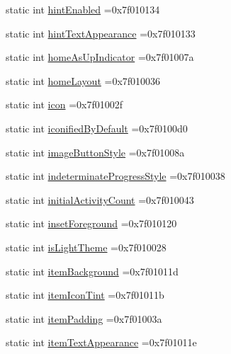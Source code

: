 \begin{DoxyCompactItemize}
static int \hyperlink{classandroid_1_1support_1_1v4_1_1R_1_1attr_a5f4a8cb83603d7a45db4b5284ebe1a41}{hint\+Enabled} =0x7f010134
\item 
static int \hyperlink{classandroid_1_1support_1_1v4_1_1R_1_1attr_a858dc23526090905ecc8c3669886a11e}{hint\+Text\+Appearance} =0x7f010133
\item 
static int \hyperlink{classandroid_1_1support_1_1v4_1_1R_1_1attr_a97ae31144cbfcae435daedba111ed06d}{home\+As\+Up\+Indicator} =0x7f01007a
\item 
static int \hyperlink{classandroid_1_1support_1_1v4_1_1R_1_1attr_aea252ac5ec97a6ebd1e1f4b2ab6d36b2}{home\+Layout} =0x7f010036
\item 
static int \hyperlink{classandroid_1_1support_1_1v4_1_1R_1_1attr_a8b36ffbef72c995a962ef0ca3d414c7e}{icon} =0x7f01002f
\item 
static int \hyperlink{classandroid_1_1support_1_1v4_1_1R_1_1attr_aa9f1d1d1b5e0a8ba7afe8a2eaecd953f}{iconified\+By\+Default} =0x7f0100d0
\item 
static int \hyperlink{classandroid_1_1support_1_1v4_1_1R_1_1attr_af6785bda01a49bcd1c0eec8a98ad437d}{image\+Button\+Style} =0x7f01008a
\item 
static int \hyperlink{classandroid_1_1support_1_1v4_1_1R_1_1attr_af1ca710e3b6f2eed102575a6bb2797ce}{indeterminate\+Progress\+Style} =0x7f010038
\item 
static int \hyperlink{classandroid_1_1support_1_1v4_1_1R_1_1attr_a6e769e9a19c417859130f49992f57799}{initial\+Activity\+Count} =0x7f010043
\item 
static int \hyperlink{classandroid_1_1support_1_1v4_1_1R_1_1attr_acc9e3a4e14d94e134cd2db9c8793285e}{inset\+Foreground} =0x7f010120
\item 
static int \hyperlink{classandroid_1_1support_1_1v4_1_1R_1_1attr_a01391e8482aa0e5b8e409f2985a70c34}{is\+Light\+Theme} =0x7f010028
\item 
static int \hyperlink{classandroid_1_1support_1_1v4_1_1R_1_1attr_aa406a89c6cbd17dba970776ae457d426}{item\+Background} =0x7f01011d
\item 
static int \hyperlink{classandroid_1_1support_1_1v4_1_1R_1_1attr_a3a30b4e249ac1ab4d8711bf25d85e0fe}{item\+Icon\+Tint} =0x7f01011b
\item 
static int \hyperlink{classandroid_1_1support_1_1v4_1_1R_1_1attr_a62722269620cd4510318f4893382708c}{item\+Padding} =0x7f01003a
\item 
static int \hyperlink{classandroid_1_1support_1_1v4_1_1R_1_1attr_a1ba476808cf74de21a386d8c81888cf9}{item\+Text\+Appearance} =0x7f01011e

\end{DoxyCompactItemize}
